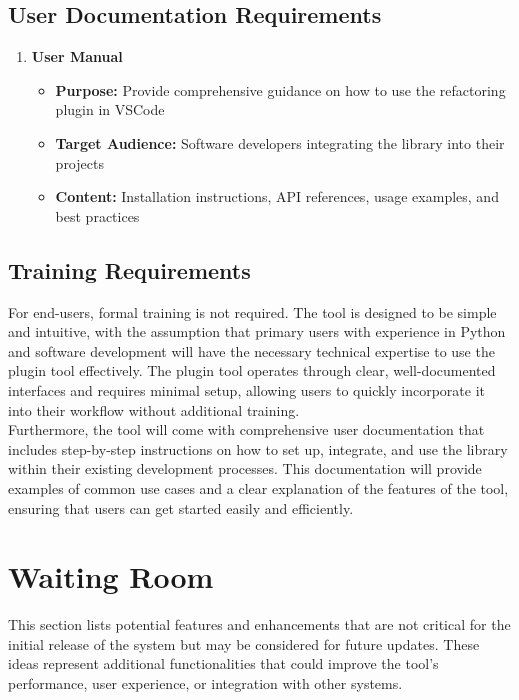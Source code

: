 \documentclass[12pt]{article}
\begin{document}
\subsection{User Documentation Requirements}
\begin{enumerate}
  \item \textbf{User Manual}
    \begin{itemize}
      \item \textbf{Purpose:} Provide comprehensive guidance on how
        to use the refactoring plugin in VSCode
      \item \textbf{Target Audience:} Software developers integrating
        the library into their projects
      \item \textbf{Content:} Installation instructions, API
        references, usage examples, and best practices
    \end{itemize}
\end{enumerate}

\subsection{Training Requirements}
For end-users, formal training is not required. The tool is designed to be simple and intuitive, 
with the assumption that primary users with experience in Python and software development will 
have the necessary technical expertise to use the plugin tool effectively. The plugin tool 
operates through clear, well-documented interfaces and requires minimal setup, allowing users to 
quickly incorporate it into their workflow without additional training.\\

Furthermore, the tool will come with comprehensive user documentation that includes step-by-step 
instructions on how to set up, integrate, and use the library within their existing development 
processes. This documentation will provide examples of common use cases and a clear explanation of 
the features of the tool, ensuring that users can get started easily and efficiently.

\section{Waiting Room}

This section lists potential features and enhancements that are not
critical for the initial release of the system but may be considered
for future updates. These ideas represent additional functionalities
that could improve the tool’s performance, user experience, or
integration with other systems.
\end{document}

